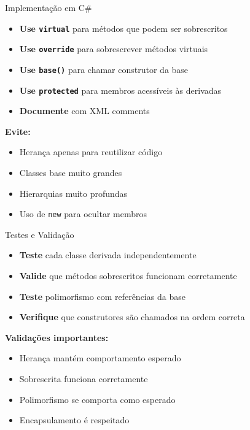 \documentclass[aspectratio=169]{beamer}
\begin{document}
\begin{frame}{Implementação em C\#}
\begin{itemize}
\item \textbf{Use \texttt{virtual}} para métodos que podem ser sobrescritos
\item \textbf{Use \texttt{override}} para sobrescrever métodos virtuais
\item \textbf{Use \texttt{base()}} para chamar construtor da base
\item \textbf{Use \texttt{protected}} para membros acessíveis às derivadas
\item \textbf{Documente} com XML comments
\end{itemize}

\vspace{0.5cm}
\textbf{Evite:}
\begin{itemize}
\item Herança apenas para reutilizar código
\item Classes base muito grandes
\item Hierarquias muito profundas
\item Uso de \texttt{new} para ocultar membros
\end{itemize}
\end{frame}

\begin{frame}{Testes e Validação}
\begin{itemize}
\item \textbf{Teste} cada classe derivada independentemente
\item \textbf{Valide} que métodos sobrescritos funcionam corretamente
\item \textbf{Teste} polimorfismo com referências da base
\item \textbf{Verifique} que construtores são chamados na ordem correta
\end{itemize}

\vspace{0.5cm}
\textbf{Validações importantes:}
\begin{itemize}
\item Herança mantém comportamento esperado
\item Sobrescrita funciona corretamente
\item Polimorfismo se comporta como esperado
\item Encapsulamento é respeitado
\end{itemize}
\end{frame}
\end{document}
